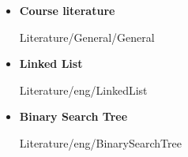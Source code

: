 \begin{itemize}
  \item
    \textbf{Course literature}
    \begin{btSect}{Literature/General/General}
      \btPrintAll
    \end{btSect}
\end{itemize}
\newpage
\begin{itemize}
  \item
    \textbf{Linked List}
    \begin{btSect}{Literature/eng/LinkedList}
      \btPrintAll
    \end{btSect}
  \item
    \textbf{Binary Search Tree}
    \begin{btSect}{Literature/eng/BinarySearchTree}
      \btPrintAll
    \end{btSect}
\end{itemize}
